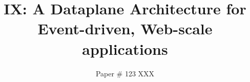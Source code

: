 \documentclass[10pt,twocolumn]{article}
\begin{document}
\title{\bf IX: A Dataplane Architecture for \break Event-driven, Web-scale applications}


\author{Paper \# 123 XXX}
\date{}
\maketitle
\thispagestyle{empty}










%






 
\end{document}
